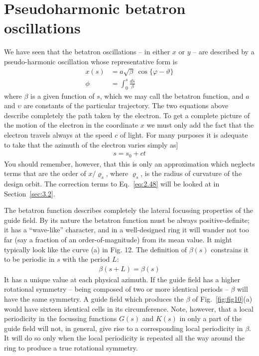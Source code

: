 \section{Pseudoharmonic betatron oscillations}\label{sec:2.6}
We have seen that the betatron oscillations -- in either $x$ or $y$ -- are described by a pseudo-harmonic oscillation whose representative form is
\begin{align}
	x(s) &= a\sqrt{\beta}\ \cos\{\varphi-\vartheta\}\label{eq:2.46}\\
	\phi &= \int_{0}^{s} \frac{d\bar{s}}{\beta}\label{eq:2.47}
\end{align}
where $\beta$ is a given function of $s$, which we may call the betatron function, and $a$
and $\upsilon$ are constants of the particular trajectory. The two equations above describe completely the path taken by the electron. To get a complete picture of the motion of the electron in the coordinate $x$ we must only add the fact that the electron travels always at the speed $c$ of light. For many purposes it is adequate to take that the azimuth of the electron varies simply as]
\begin{align}
	s = s_0 + ct\label{eq:2.48}
\end{align}
You should remember, however, that this is only an approximation which neglects terms that are the order of $x/\varrho_s$, where $\varrho_s$, is the radius of curvature of the design orbit. The correction terms to Eq.~\eqref{eq:2.48} will be looked at in Section~\ref{sec:3.2}.

The betatron function describes completely the lateral focussing properties of the guide field. By its nature the betatron function must be always positive-definite; it has a “wave-like” character, and in a well-designed ring it will wander not too far (say a fraction of an order-of-magnitude) from its mean value. It might typically look like the curve (a) in Fig. 12. The definition of $\beta(s)$ constrains it to be periodic in $s$ with the period $L$:
\begin{align}
	\beta(s+L) = \beta(s)
\end{align}
It has a unique value at each physical azimuth. If the guide field has a higher rotational symmetry -- being composed of two or more identical periods -- $\beta$ will have the same symmetry. A guide field which produces the $\beta$ of Fig.~\ref{fig:fig10}(a) would have sixteen identical cells in its circumference. Note, however, that a local periodicity in the focussing functions $G(s)$ and $K(s)$ in only a part of the guide field will not, in general, give rise to a corresponding local periodicity in $\beta$. It will do so only when the local periodicity is repeated all the way around the ring to produce a true rotational symmetry.


